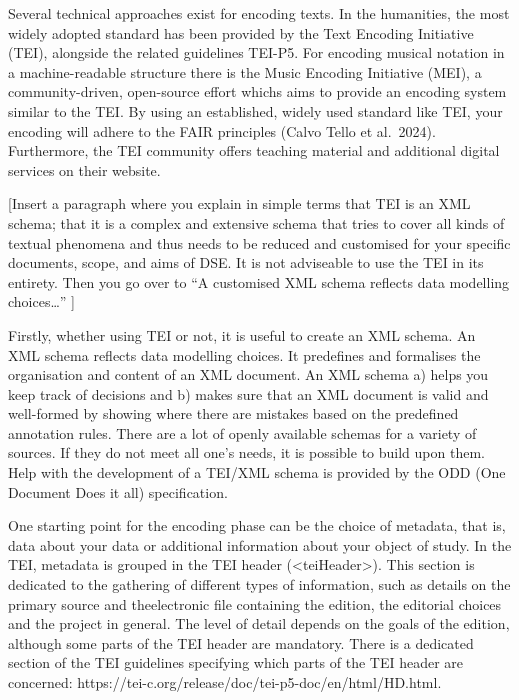 \documentclass[
  letterpaper,
  DIV=11,
  numbers=noendperiod]{scrreprt}
\begin{document}
Several technical approaches exist for encoding texts. In the
humanities, the most widely adopted standard has been provided by the
Text Encoding Initiative (TEI), alongside the related guidelines TEI-P5.
For encoding musical notation in a machine-readable structure there is
the Music Encoding Initiative (MEI), a community-driven, open-source
effort whichs aims to provide an encoding system similar to the TEI. By
using an established, widely used standard like TEI, your encoding will
adhere to the FAIR principles (Calvo Tello et al.~2024). Furthermore,
the TEI community offers teaching material and additional digital
services on their website.

{[}Insert a paragraph where you explain in simple terms that TEI is an
XML schema; that it is a complex and extensive schema that tries to
cover all kinds of textual phenomena and thus needs to be reduced and
customised for your specific documents, scope, and aims of DSE. It is
not adviseable to use the TEI in its entirety. Then you go over to ``A
customised XML schema reflects data modelling choices\ldots{}'' {]}

Firstly, whether using TEI or not, it is useful to create an XML schema.
An XML schema reflects data modelling choices. It predefines and
formalises the organisation and content of an XML document. An XML
schema a) helps you keep track of decisions and b) makes sure that an
XML document is valid and well-formed by showing where there are
mistakes based on the predefined annotation rules. There are a lot of
openly available schemas for a variety of sources. If they do not meet
all one's needs, it is possible to build upon them. Help with the
development of a TEI/XML schema is provided by the ODD (One Document
Does it all) specification.

One starting point for the encoding phase can be the choice of metadata,
that is, data about your data or additional information about your
object of study. In the TEI, metadata is grouped in the TEI header
(\textless teiHeader\textgreater). This section is dedicated to the
gathering of different types of information, such as details on the
primary source and theelectronic file containing the edition, the
editorial choices and the project in general. The level of detail
depends on the goals of the edition, although some parts of the TEI
header are mandatory. There is a dedicated section of the TEI guidelines
specifying which parts of the TEI header are concerned:
https://tei-c.org/release/doc/tei-p5-doc/en/html/HD.html.
\end{document}
